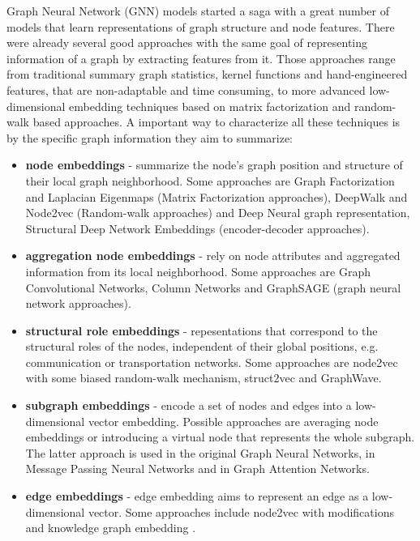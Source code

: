 \documentclass[a4paper]{article}
\begin{document}
Graph Neural Network (GNN) models started a saga with a great number of models that learn representations of graph structure and node features. There were already several good approaches with the same goal of representing information of a graph by extracting features from it. Those approaches range from traditional summary graph statistics, kernel functions and hand-engineered features, that are non-adaptable and time consuming, to more advanced low-dimensional embedding techniques based on matrix factorization and random-walk based approaches. A important way to characterize all these techniques is by the specific graph information they aim to summarize:
\begin{itemize}
    \item \textbf{node embeddings} - summarize the node's graph position and structure of their local graph neighborhood. Some approaches are Graph Factorization and Laplacian Eigenmaps (Matrix Factorization approaches), DeepWalk and Node2vec (Random-walk approaches) and Deep Neural graph representation, Structural Deep Network Embeddings (encoder-decoder approaches).
    \item \textbf{aggregation node embeddings} - rely on node attributes and aggregated information from its local neighborhood. Some approaches are Graph Convolutional Networks, Column Networks and GraphSAGE (graph neural network approaches). 
    \item \textbf{structural role embeddings} - repesentations that correspond to the structural roles of the nodes, independent of their global positions, e.g. communication or transportation networks. Some approaches are node2vec with some biased random-walk mechanism, struct2vec and GraphWave.
    \item \textbf{subgraph embeddings} - encode a set of nodes and edges into a low-dimensional vector embedding. Possible approaches are averaging node embeddings or introducing a virtual node that represents the whole subgraph. The latter approach is used in the original Graph Neural Networks, in Message Passing Neural Networks and in Graph Attention Networks.
    \item \textbf{edge embeddings} - edge embedding aims to represent an edge as a low-dimensional vector. Some approaches include node2vec with modifications and knowledge graph embedding \cite{knowledgeg}.
\end{itemize}
\end{document}
